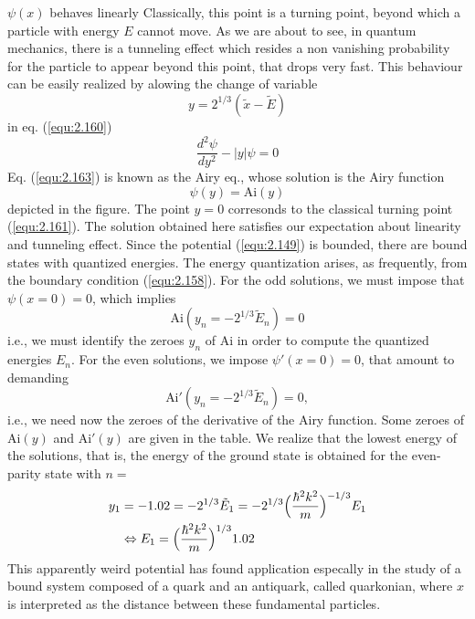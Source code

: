 $\psi(x)$ behaves linearly Classically, this point is a
turning point, beyond which a particle with energy $E$
cannot move. As we are about to see, in quantum mechanics,
there is a tunneling effect which resides a non vanishing
probability for the particle to appear beyond this point,
that drops very fast. This behaviour can be easily realized
by alowing the change of variable
\begin{equation}
  y = 2^{1/3} (\tilde{x}-\tilde{E})
  \label{equ:2.152}
\end{equation}
in eq. (\ref{equ:2.160})
\begin{equation}
  \frac{d^2 \psi}{dy^2} - |y| \psi = 0
  \label{equ:2.163}
\end{equation}
Eq. (\ref{equ:2.163}) is known as the Airy eq., whose
solution is the Airy function
\begin{equation}
  \psi(y) = \text{Ai}(y)
  \label{equ:2.164}
\end{equation}
depicted in the figure. The point $y=0$ corresonds to the
classical turning point (\ref{equ:2.161}). The solution
obtained here satisfies our expectation about linearity and
tunneling effect.
Since the potential (\ref{equ:2.149}) is bounded, there are
bound states with quantized energies. The energy
quantization arises, as frequently, from the boundary
condition (\ref{equ:2.158}).
For the odd solutions, we must impose that $\psi(x=0) = 0$,
which implies
\begin{equation}
  \text{Ai}(y_n = -2^{1/3}\tilde{E}_n) = 0
  \label{equ:2.164}
\end{equation}
i.e., we must identify the zeroes $y_n$ of $\text{Ai}$ in
order to compute the quantized energies $E_n$. For the even
solutions, we impose $\psi'(x=0) = 0$, that amount  to
demanding
\begin{equation}
  \text{Ai}'(y_n = -2^{1/3}\tilde{E}_n) = 0,
  \label{equ:2.165}
\end{equation}
i.e., we need now the zeroes of the derivative of the Airy
function. Some zeroes of $\text{Ai}(y)$ and $\text{Ai}'(y)$
are given in the table.
We realize that the lowest energy of the solutions, that is,
the energy of the ground state is obtained for the
even-parity state with $n =$
\begin{alignat}{2}
  y_1 &= -1.02 = -2^{1/3}\tilde{E}_1 = -2^{1/3}
  \Bigl(\frac{\hbar^2 k^2}{m}\Bigr)^{-1/3}E_1\nonumber\\
  &\Leftrightarrow E_1 = \Bigl(\frac{\hbar^2
k^2}{m}\Bigr)^{1/3} 1.02 \label{equ:2.166}
\end{alignat}
This apparently weird potential has found application
especally in the study of a bound system composed of a quark
and an antiquark, called quarkonian, where $x$ is
interpreted as the distance between these fundamental
particles.
